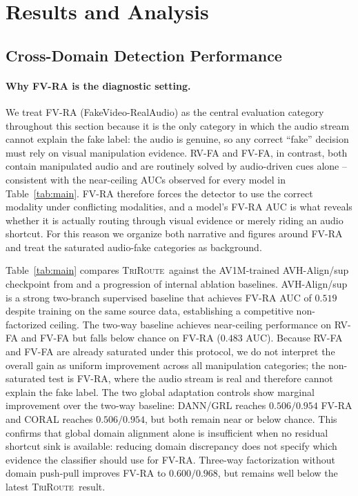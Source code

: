 \documentclass{article}
\newcommand{\method}{\textsc{TriRoute}}
\begin{document}
\section{Results and Analysis}

\subsection{Cross-Domain Detection Performance}

\paragraph{Why FV-RA is the diagnostic setting.}
We treat FV-RA (FakeVideo-RealAudio) as the central evaluation category throughout this section because it is the only category in which the audio stream cannot explain the fake label: the audio is genuine, so any correct ``fake'' decision must rely on visual manipulation evidence. RV-FA and FV-FA, in contrast, both contain manipulated audio and are routinely solved by audio-driven cues alone -- consistent with the near-ceiling AUCs observed for every model in Table~\ref{tab:main}. FV-RA therefore forces the detector to use the correct modality under conflicting modalities, and a model's FV-RA AUC is what reveals whether it is actually routing through visual evidence or merely riding an audio shortcut. For this reason we organize both narrative and figures around FV-RA and treat the saturated audio-fake categories as background.

Table~\ref{tab:main} compares \method\ against the AV1M-trained AVH-Align/sup checkpoint from \citet{smeu2025avhalign} and a progression of internal ablation baselines. AVH-Align/sup is a strong two-branch supervised baseline that achieves FV-RA AUC of $0.519$ despite training on the same source data, establishing a competitive non-factorized ceiling. The two-way baseline achieves near-ceiling performance on RV-FA and FV-FA but falls below chance on FV-RA ($0.483$ AUC). Because RV-FA and FV-FA are already saturated under this protocol, we do not interpret the overall gain as uniform improvement across all manipulation categories; the non-saturated test is FV-RA, where the audio stream is real and therefore cannot explain the fake label. The two global adaptation controls show marginal improvement over the two-way baseline: DANN/GRL reaches $0.506/0.954$ FV-RA and CORAL reaches $0.506/0.954$, but both remain near or below chance. This confirms that global domain alignment alone is insufficient when no residual shortcut sink is available: reducing domain discrepancy does not specify which evidence the classifier should use for FV-RA. Three-way factorization without domain push-pull improves FV-RA to $0.600/0.968$, but remains well below the latest \method\ result.
\end{document}
